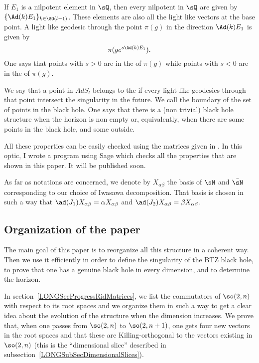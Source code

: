 If $E_1$ is a nilpotent element in $\sQ$, then every nilpotent in $\sQ$ are given by $\{ \Ad(k)E_1 \}_{k\in\SO(l-1)}$. These elements are also all the light like vectors at the base point. A light like geodesic through the point $\pi(g)$ in the direction $\Ad(k)E_1$ is given by
\begin{equation}
	\pi(g e^{s\Ad(k)E_1}).
\end{equation}
One says that  points with $s>0$ are in the  of $\pi(g)$ while points with $s<0$ are in the  of $\pi(g)$.

We say that a point in $AdS_l$ belongs to the  if every light like geodesics through that point intersect the singularity in the future. We call  the boundary of the set of points in the black hole. One says that there is a (non trivial) black hole structure when the horizon is non empty or, equivalently, when there are some points in the black hole, and some outside.

All these properties can be easily checked using the matrices given in \cite{These,lcTNAdS}. In this optic, I wrote a program using Sage\cite{Sage} which checks all the properties that are shown in this paper. It will be published soon.

As far as notations are concerned, we denote by $X_{\alpha\beta}$ the basis of $\sN$ and $\bar\sN$ corresponding to our choice of Iwasawa decomposition. That basis is chosen in such a way that $\ad(J_1)X_{\alpha\beta}=\alpha X_{\alpha\beta}$ and $\ad(J_2)X_{\alpha\beta}=\beta X_{\alpha\beta}$.

%
\subsection{Organization of the paper}
%

The main goal of this paper is to reorganize all this structure in a coherent way. Then we use it efficiently in order to define the singularity of the BTZ black hole, to prove that one has a genuine black hole in every dimension, and to determine the horizon.

In section~\ref{LONGSecProgressRidMatrices}, we list the commutators of $\so(2,n)$ with respect to its root spaces and we organize them in such a way to get a clear idea about the evolution of the structure when the dimension increases. We prove that, when one passes from $\so(2,n)$ to $\so(2,n+1)$, one gets four new vectors in the root spaces and that these are Killing-orthogonal to the vectors existing in $\so(2,n)$ (this is the ``dimensional slice'' described in subsection~\ref{LONGSubSecDimensionalSlices}).

